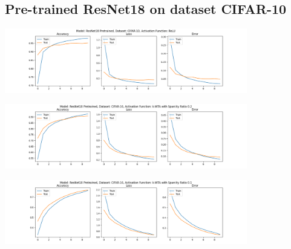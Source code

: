 \documentclass[a4paper]{article}
\begin{document}
		\subsection{Pre-trained ResNet18 on dataset CIFAR-10}
			\begin{center}
				\centering
				\includegraphics[width=400px,keepaspectratio]{ResNet18_CIFAR-10_ReLU_Pretrained.png}
			\end{center}
			\begin{center}
				\centering
				\includegraphics[width=400px,keepaspectratio]{ResNet18_CIFAR-10_k-WTA_0.2_Pretrained.png}
			\end{center}
			\begin{center}
				\centering
				\includegraphics[width=400px,keepaspectratio]{ResNet18_CIFAR-10_k-WTA_0.1_Pretrained.png}
			\end{center}
		
		 
		
\end{document}
